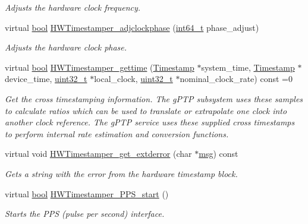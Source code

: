 \begin{DoxyCompactItemize}
\begin{DoxyCompactList}\small\item\em Adjusts the hardware clock frequency. \end{DoxyCompactList}\item 
virtual \hyperlink{avb__gptp_8h_af6a258d8f3ee5206d682d799316314b1}{bool} \hyperlink{class_common_timestamper_aa9470ea1623c3718913fbff1c55e3115}{H\+W\+Timestamper\+\_\+adjclockphase} (\hyperlink{parse_8c_a67a9885ef4908cb72ce26d75b694386c}{int64\+\_\+t} phase\+\_\+adjust)
\begin{DoxyCompactList}\small\item\em Adjusts the hardware clock phase. \end{DoxyCompactList}\item 
virtual \hyperlink{avb__gptp_8h_af6a258d8f3ee5206d682d799316314b1}{bool} \hyperlink{class_common_timestamper_a10b54d66a60067c0084748f955164073}{H\+W\+Timestamper\+\_\+gettime} (\hyperlink{class_timestamp}{Timestamp} $\ast$system\+\_\+time, \hyperlink{class_timestamp}{Timestamp} $\ast$device\+\_\+time, \hyperlink{parse_8c_a6eb1e68cc391dd753bc8ce896dbb8315}{uint32\+\_\+t} $\ast$local\+\_\+clock, \hyperlink{parse_8c_a6eb1e68cc391dd753bc8ce896dbb8315}{uint32\+\_\+t} $\ast$nominal\+\_\+clock\+\_\+rate) const =0
\begin{DoxyCompactList}\small\item\em Get the cross timestamping information. The g\+P\+TP subsystem uses these samples to calculate ratios which can be used to translate or extrapolate one clock into another clock reference. The g\+P\+TP service uses these supplied cross timestamps to perform internal rate estimation and conversion functions. \end{DoxyCompactList}\item 
virtual void \hyperlink{class_common_timestamper_a3b26113436dec73775d2cbc523a6e074}{H\+W\+Timestamper\+\_\+get\+\_\+extderror} (char $\ast$\hyperlink{openavb__log_8c_a0c7e58a50354c4a4d6dad428d0e47029}{msg}) const 
\begin{DoxyCompactList}\small\item\em Gets a string with the error from the hardware timestamp block. \end{DoxyCompactList}\item 
virtual \hyperlink{avb__gptp_8h_af6a258d8f3ee5206d682d799316314b1}{bool} \hyperlink{class_common_timestamper_a2cbaeb84807ca61af0bc56bcc475468d}{H\+W\+Timestamper\+\_\+\+P\+P\+S\+\_\+start} ()
\begin{DoxyCompactList}\small\item\em Starts the P\+PS (pulse per second) interface. \end{DoxyCompactList}\item 

\end{DoxyCompactItemize}

